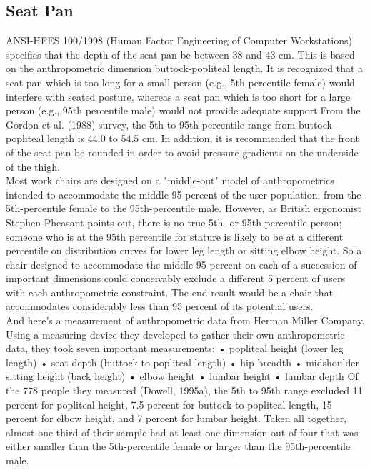 \documentclass[paper=a4, fontsize=12pt, ]{scrartcl} %
\numberwithin{equation}{section} %
\numberwithin{figure}{section} %
\numberwithin{table}{section} %
\begin{document}
\subsection{Seat Pan}
  ANSI-HFES 100/1998 (Human Factor Engineering of Computer Workstations) specifies that the depth of the seat pan be between 38 and 43 cm. This is based on the anthropometric dimension buttock-popliteal length. It is recognized that a seat pan which is too long for a small person (e.g., 5th percentile female) would interfere with seated posture, whereas a seat pan which is too short for a large person (e.g., 95th percentile male) would not provide adequate support.From the Gordon et al. (1988) survey, the 5th to 95th percentile range from buttock-popliteal length is 44.0 to 54.5 cm. In addition, it is recommended that the front of the seat pan be rounded in order to avoid pressure gradients on the underside of the thigh.
\\
  Most work chairs are designed on a "middle-out" model of anthropometrics intended to accommodate the middle 95 percent of the user population: from the 5th-percentile female to the
95th-percentile male. However, as British ergonomist Stephen Pheasant points out, there is no true 5th- or 95th-percentile person; someone who is at the 95th percentile for stature is likely to be at a different percentile on distribution curves for lower leg length or sitting elbow height. So a chair designed to accommodate the middle 95 percent on each of a succession of important dimensions could conceivably exclude a different 5 percent of users with each anthropometric constraint. The end result would be a chair that accommodates considerably less than 95 percent of its potential users.
\\
And here's a measurement of anthropometric data from Herman Miller Company.
Using a measuring device they developed to gather their own anthropometric data, they took seven important measurements:
• popliteal height (lower leg length)
• seat depth (buttock to popliteal length)
• hip breadth
• midshoulder sitting height (back height)
• elbow height
• lumbar height
• lumbar depth
Of the 778 people they measured (Dowell, 1995a), the 5th to 95th range excluded 11 percent for popliteal height, 7.5 percent for buttock-to-popliteal length, 15 percent for elbow height, and 7 percent for lumbar height. Taken all together, almost one-third
of their sample had at least one dimension out of four that was either smaller than the 5th-percentile female or larger than the 95th-percentile male.
\end{document}
